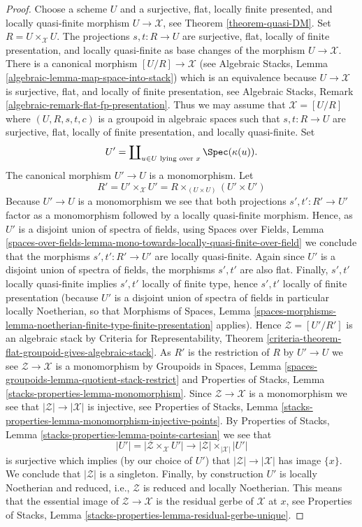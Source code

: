 \begin{proof}
Choose a scheme $U$ and a surjective, flat, locally finite presented,
and locally quasi-finite morphism $U \to \mathcal{X}$, see
Theorem \ref{theorem-quasi-DM}.
Set $R = U \times_\mathcal{X} U$. The projections $s, t : R \to U$
are surjective, flat, locally of finite presentation, and
locally quasi-finite as base changes of the morphism $U \to \mathcal{X}$.
There is a canonical morphism $[U/R] \to \mathcal{X}$ (see
Algebraic Stacks, Lemma \ref{algebraic-lemma-map-space-into-stack})
which is an equivalence because $U \to \mathcal{X}$ is surjective, flat,
and locally of finite presentation, see
Algebraic Stacks, Remark \ref{algebraic-remark-flat-fp-presentation}.
Thus we may assume that $\mathcal{X} = [U/R]$ where
$(U, R, s, t, c)$ is a groupoid in algebraic spaces such that
$s, t : R \to U$ are surjective, flat, locally of finite presentation,
and locally quasi-finite. Set
$$
U' = \coprod\nolimits_{u \in U\text{ lying over }x} \Spec(\kappa(u)).
$$
The canonical morphism $U' \to U$ is a monomorphism. Let
$$
R' = U' \times_\mathcal{X} U' =
R \times_{(U \times U)} (U' \times U')
$$
Because $U' \to U$ is a monomorphism we see that both projections
$s', t' : R' \to U'$ factor as a monomorphism followed by a locally
quasi-finite morphism. Hence, as $U'$ is a disjoint union of spectra
of fields, using
Spaces over Fields, Lemma
\ref{spaces-over-fields-lemma-mono-towards-locally-quasi-finite-over-field}
we conclude that the morphisms $s', t' : R' \to U'$ are locally quasi-finite.
Again since $U'$ is a disjoint union of spectra of fields, the morphisms
$s', t'$ are also flat. Finally, $s', t'$ locally quasi-finite
implies $s', t'$ locally of finite type, hence $s', t'$ locally of finite
presentation (because $U'$ is a disjoint union of spectra of fields
in particular locally Noetherian, so that
Morphisms of Spaces, Lemma
\ref{spaces-morphisms-lemma-noetherian-finite-type-finite-presentation}
applies). Hence $\mathcal{Z} = [U'/R']$ is an algebraic stack by
Criteria for Representability, Theorem
\ref{criteria-theorem-flat-groupoid-gives-algebraic-stack}.
As $R'$ is the restriction of $R$ by $U' \to U$ we see
$\mathcal{Z} \to \mathcal{X}$ is a monomorphism by
Groupoids in Spaces, Lemma
\ref{spaces-groupoids-lemma-quotient-stack-restrict}
and
Properties of Stacks, Lemma \ref{stacks-properties-lemma-monomorphism}.
Since $\mathcal{Z} \to \mathcal{X}$ is a monomorphism we see that
$|\mathcal{Z}| \to |\mathcal{X}|$ is injective, see
Properties of Stacks, Lemma
\ref{stacks-properties-lemma-monomorphism-injective-points}.
By
Properties of Stacks, Lemma \ref{stacks-properties-lemma-points-cartesian}
we see that
$$
|U'| = |\mathcal{Z} \times_\mathcal{X} U'|
\longrightarrow
|\mathcal{Z}| \times_{|\mathcal{X}|} |U'|
$$
is surjective which implies (by our choice of $U'$) that
$|\mathcal{Z}| \to |\mathcal{X}|$ has image $\{x\}$.
We conclude that $|\mathcal{Z}|$ is a singleton.
Finally, by construction $U'$ is locally Noetherian and reduced, i.e.,
$\mathcal{Z}$ is reduced and locally Noetherian. This means that
the essential image of $\mathcal{Z} \to \mathcal{X}$
is the residual gerbe of $\mathcal{X}$ at $x$, see
Properties of Stacks, Lemma
\ref{stacks-properties-lemma-residual-gerbe-unique}.
\end{proof}

